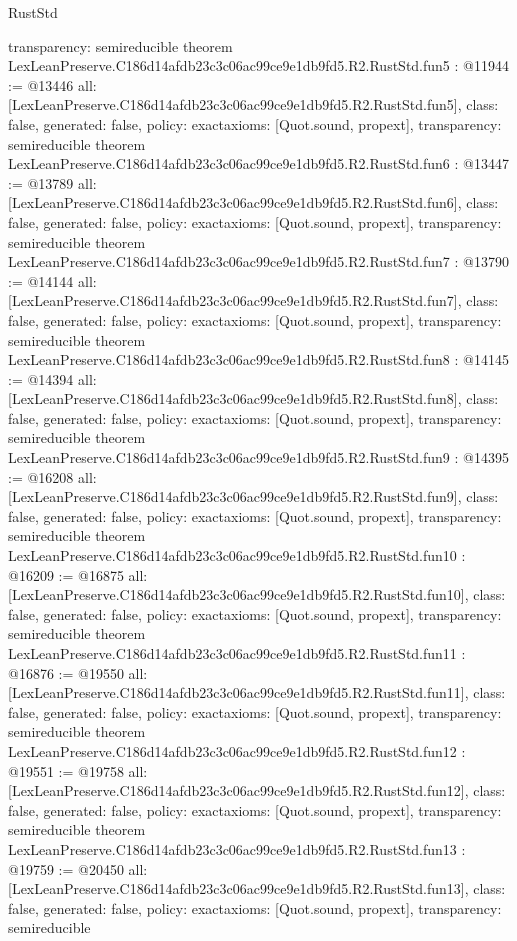 \begin{lexlean}{RustStd}
\begin{coremodule}
{  transparency: semireducible
}
theorem LexLeanPreserve.C186d14afdb23c3c06ac99ce9e1db9fd5.R2.RustStd.fun5 : @11944 := @13446 {
  all: [LexLeanPreserve.C186d14afdb23c3c06ac99ce9e1db9fd5.R2.RustStd.fun5],
  class: false,
  generated: false,
  policy: exact{axioms: [Quot.sound, propext]},
  transparency: semireducible
}
theorem LexLeanPreserve.C186d14afdb23c3c06ac99ce9e1db9fd5.R2.RustStd.fun6 : @13447 := @13789 {
  all: [LexLeanPreserve.C186d14afdb23c3c06ac99ce9e1db9fd5.R2.RustStd.fun6],
  class: false,
  generated: false,
  policy: exact{axioms: [Quot.sound, propext]},
  transparency: semireducible
}
theorem LexLeanPreserve.C186d14afdb23c3c06ac99ce9e1db9fd5.R2.RustStd.fun7 : @13790 := @14144 {
  all: [LexLeanPreserve.C186d14afdb23c3c06ac99ce9e1db9fd5.R2.RustStd.fun7],
  class: false,
  generated: false,
  policy: exact{axioms: [Quot.sound, propext]},
  transparency: semireducible
}
theorem LexLeanPreserve.C186d14afdb23c3c06ac99ce9e1db9fd5.R2.RustStd.fun8 : @14145 := @14394 {
  all: [LexLeanPreserve.C186d14afdb23c3c06ac99ce9e1db9fd5.R2.RustStd.fun8],
  class: false,
  generated: false,
  policy: exact{axioms: [Quot.sound, propext]},
  transparency: semireducible
}
theorem LexLeanPreserve.C186d14afdb23c3c06ac99ce9e1db9fd5.R2.RustStd.fun9 : @14395 := @16208 {
  all: [LexLeanPreserve.C186d14afdb23c3c06ac99ce9e1db9fd5.R2.RustStd.fun9],
  class: false,
  generated: false,
  policy: exact{axioms: [Quot.sound, propext]},
  transparency: semireducible
}
theorem LexLeanPreserve.C186d14afdb23c3c06ac99ce9e1db9fd5.R2.RustStd.fun10 : @16209 := @16875 {
  all: [LexLeanPreserve.C186d14afdb23c3c06ac99ce9e1db9fd5.R2.RustStd.fun10],
  class: false,
  generated: false,
  policy: exact{axioms: [Quot.sound, propext]},
  transparency: semireducible
}
theorem LexLeanPreserve.C186d14afdb23c3c06ac99ce9e1db9fd5.R2.RustStd.fun11 : @16876 := @19550 {
  all: [LexLeanPreserve.C186d14afdb23c3c06ac99ce9e1db9fd5.R2.RustStd.fun11],
  class: false,
  generated: false,
  policy: exact{axioms: [Quot.sound, propext]},
  transparency: semireducible
}
theorem LexLeanPreserve.C186d14afdb23c3c06ac99ce9e1db9fd5.R2.RustStd.fun12 : @19551 := @19758 {
  all: [LexLeanPreserve.C186d14afdb23c3c06ac99ce9e1db9fd5.R2.RustStd.fun12],
  class: false,
  generated: false,
  policy: exact{axioms: [Quot.sound, propext]},
  transparency: semireducible
}
theorem LexLeanPreserve.C186d14afdb23c3c06ac99ce9e1db9fd5.R2.RustStd.fun13 : @19759 := @20450 {
  all: [LexLeanPreserve.C186d14afdb23c3c06ac99ce9e1db9fd5.R2.RustStd.fun13],
  class: false,
  generated: false,
  policy: exact{axioms: [Quot.sound, propext]},
  transparency: semireducible
}
\end{coremodule}
\end{lexlean}
